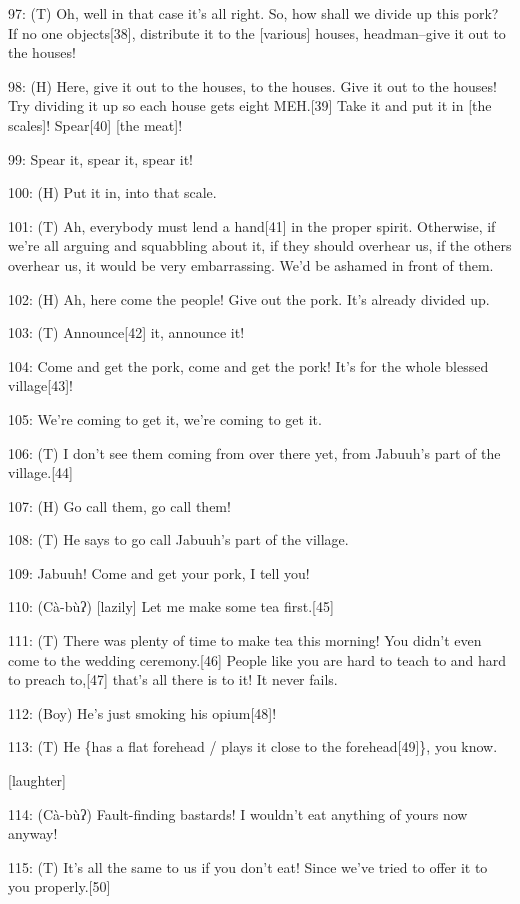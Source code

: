 97: (T) Oh, well in that case it's all right. So, how shall we divide up this pork?
If no one objects[38], distribute it to the [various] houses, headman--give it
out to the houses!

98: (H) Here, give it out to the houses, to the houses. Give it out to the houses!
Try dividing it up so each house gets eight MEH.[39] Take it and put it in [the
scales]! Spear[40] [the meat]!

99: Spear it, spear it, spear it!

100: (H) Put it in, into that scale.

101: (T) Ah, everybody must lend a hand[41] in the proper spirit. Otherwise, if
we're all arguing and squabbling about it, if they should overhear us, if the others
overhear us, it would be very embarrassing. We'd be ashamed in front of them.

102: (H) Ah, here come the people! Give out the pork. It's already divided up.

103: (T) Announce[42] it, announce it!

104: Come and get the pork, come and get the pork! It's for the whole blessed village[43]!

105: We're coming to get it, we're coming to get it.

106: (T) I don't see them coming from over there yet, from Jabuuh's part of the
village.[44]

107: (H) Go call them, go call them!

108: (T) He says to go call Jabuuh's part of the village.

109: Jabuuh! Come and get your pork, I tell you!

110: (Cà-bùʔ) [lazily] Let me make some tea first.[45]

111: (T) There was plenty of time to make tea this morning! You didn't even come
to the wedding ceremony.[46] People like you are hard to teach to and hard to preach
to,[47] that's all there is to it! It never fails.

112: (Boy) He's just smoking his opium[48]!

113: (T) He \{has a flat forehead / plays it close to the forehead[49]\}, you know.

[laughter]

114: (Cà-bùʔ) Fault-finding bastards! I wouldn't eat anything of yours now anyway!

115: (T) It's all the same to us if you don't eat! Since we've tried to offer it
to you properly.[50]

